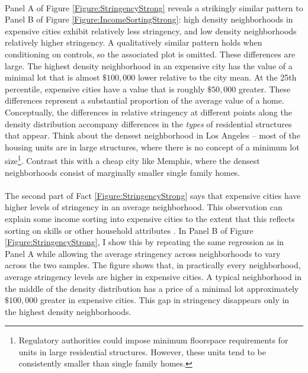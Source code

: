 \documentclass[]{article}
\begin{document}
	\paragraph*{}
	Panel A of Figure \ref{Figure:StringencyStrong} reveals a strikingly similar pattern to Panel B of Figure \ref{Figure:IncomeSortingStrong}: high density neighborhoods in expensive cities exhibit relatively less stringency, and low density neighborhoods relatively higher stringency. A qualitatively similar pattern holds when conditioning on controls, so the associated plot is omitted. These differences are large. The highest density neighborhood in an expensive city has the value of a minimal lot that is almost $\$ 100,000$ lower relative to the city mean. At the 25th percentile, expensive cities have a value that is roughly $\$ 50,000$ greater. These differences represent a substantial proportion of the average value of a home. Conceptually, the differences in relative stringency at different points along the density distribution accompany differences in the \textit{types} of residential structures that appear. Think about the densest neighborhood in Los Angeles -- most of the housing units are in large structures, where there is no concept of a minimum lot size\footnote{Regulatory authorities could impose minimum floorspace requirements for units in large residential structures. However, these units tend to be consistently smaller than single family homes.}. Contrast this with a cheap city like Memphis, where the densest neighborhoods consist of marginally smaller single family homes. 
	
	\paragraph*{}
	The second part of Fact \ref{Figure:StringencyStrong} says that expensive cities have higher levels of stringency in an average neighborhood. This observation can explain some income sorting into expensive cities to the extent that this reflects sorting on skills or other household attributes \citep{diamond2016, citysizewagegap}. In Panel B of Figure \ref{Figure:StringencyStrong}, I show this by repeating the same regression as in Panel A while allowing the average stringency across neighborhoods to vary across the two samples. The figure shows that, in practically every neighborhood, average stringency levels are higher in expensive cities. A typical neighborhood in the middle of the density distribution has a price of a minimal lot approximately $\$100,000$ greater in expensive cities. This gap in stringency disappears only in the highest density neighborhoods. 
\end{document}

